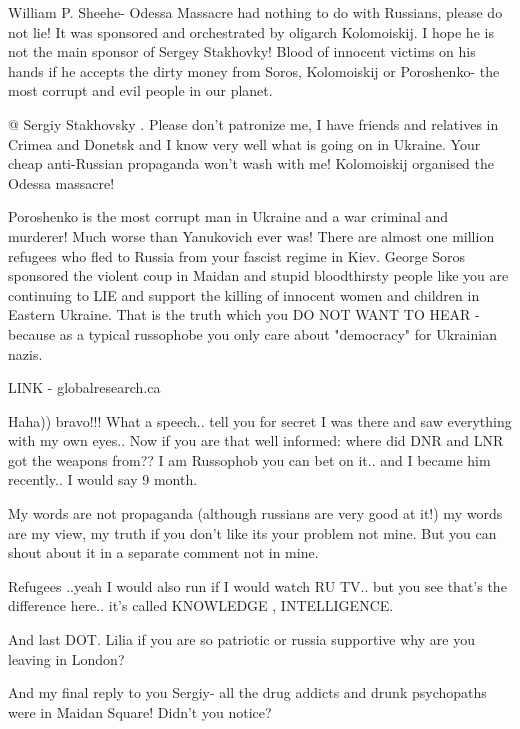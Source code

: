 \begin{itemize}
\begin{itemize}
William P. Sheehe- Odessa Massacre had nothing to do with Russians, please do
not lie! It was sponsored and orchestrated by oligarch Kolomoiskij. I hope he
is not the main sponsor of Sergey Stakhovky! Blood of innocent victims on his
hands if he accepts the dirty money from Soros, Kolomoiskij or Poroshenko- the
most corrupt and evil people in our planet.


@ Sergiy Stakhovsky . Please don't patronize me, I have friends and relatives
in Crimea and Donetsk and I know very well what is going on in Ukraine. Your
cheap anti-Russian propaganda won't wash with me! Kolomoiskij organised the
Odessa massacre!

Poroshenko is the most corrupt man in Ukraine and a war criminal and murderer!
Much worse than Yanukovich ever was! There are almost one million refugees who
fled to Russia from your fascist regime in Kiev. George Soros sponsored the
violent coup in Maidan and stupid bloodthirsty people like you are continuing
to LIE and support the killing of innocent women and children in Eastern
Ukraine. That is the truth which you DO NOT WANT TO HEAR - because as a typical
russophobe you only care about "democracy" for Ukrainian nazis.

LINK - globalresearch.ca


Haha)) bravo!!! What a speech.. tell you for secret I was there and saw
everything with my own eyes.. Now if you are that well informed: where did DNR
and LNR got the weapons from?? I am Russophob you can bet on it.. and I became
him recently.. I would say 9 month.


My words are not propaganda (although russians are very good at it!) my words
are my view, my truth if you don't like its your problem not mine. But you can
shout about it in a separate comment not in mine.


Refugees ..yeah I would also run if I would watch RU TV.. but you see that's
the difference here.. it's called KNOWLEDGE , INTELLIGENCE.


And last DOT. Lilia if you are so patriotic or russia supportive why are you
leaving in London?


And my final reply to you Sergiy- all the drug addicts and drunk psychopaths
were in Maidan Square! Didn't you notice?


\end{itemize}
\end{itemize}
